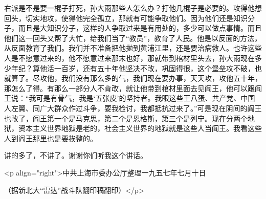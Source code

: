 右派是不是要一棍子打死，孙大雨那些人怎么办？打他几棍子是必要的。攻得他想回头，切实地攻，使得他完全孤立，那就有可能争取他们。因为他们还是知识分子，而且是大知识分子，这样的人争取过来是有用处的，多少可以做点事情。而且他们这一回头又帮了大忙，给我们当了“教员”，教育了人民。他是以反面的方法，从反面教育了我们。我们并不准备把他拋到黄浦江里，还是要治病救人。也许这些人是不愿意过来的，他不愿意过来那末也好，那就带到棺材里头去，孙大雨现在多少年纪？算他活一百岁，还有五十年他坚决不改，巩固得很，这个堡垒攻不破，也就算了。尽攻他，我们没有那么多的气，我们现在要办事，天天攻，攻他五十年，那怎么了得。有那么一部分人不肯改，就让他带到棺材里面去见阎王，他可以跟阎王说：“我可是有骨气，我是‘五张皮’的坚持者。我眼这些王八蛋、共产党、中国人左翼、同广大群众作过斗争，要我检讨，我都抵抗过来了。”可是现在阴间的阎王也改了，阎王第一个是马克思，第二个是恩格斯，第三个是列宁。现在分两个地狱，资本主义世界地狱是老的，社会主义世界的地狱就是这些人当阎王。我看这些人到阎王那里也是要挨整的。

讲的多了，不讲了。谢谢你们听我这个讲话。

<p align="right">中共上海市委办公厅整理一九五七年七月十日

（据新北大“雷达”战斗队翻印稿翻印）</p>


